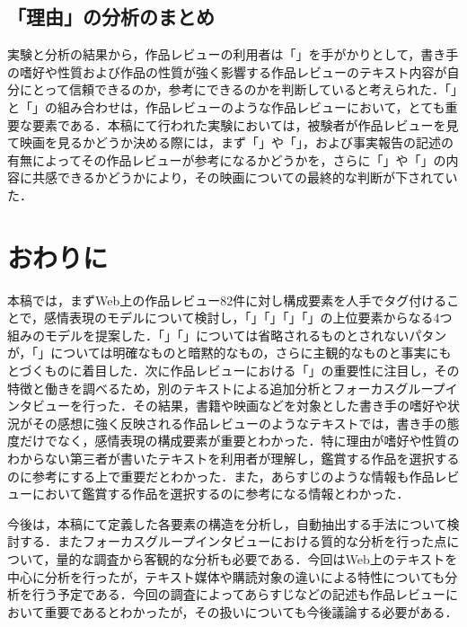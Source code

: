 \documentclass[japanese]{jnlp_1.3a}
\begin{document}
\subsection{「理由」の分析のまとめ}

実験と分析の結果から，作品レビューの利用者は「」を手がかりとして，書き手の嗜好や性質および作品の性質が強く影響する作品レビューのテキスト内容が自分にとって信頼できるのか，参考にできるのかを判断していると考えられた．「」と「」の組み合わせは，作品レビューのような作品レビューにおいて，とても重要な要素である．本稿にて行われた実験においては，被験者が作品レビューを見て映画を見るかどうか決める際には，まず「」や「」，および事実報告の記述の有無によってその作品レビューが参考になるかどうかを，さらに「」や「」の内容に共感できるかどうかにより，その映画についての最終的な判断が下されていた．

\section{おわりに}

本稿では，まずWeb上の作品レビュー82件に対し構成要素を人手でタグ付けることで，感情表現のモデルについて検討し，「」「」「」「」の上位要素からなる4つ組みのモデルを提案した．「」「」については省略されるものとされないパタンが，「」については明確なものと暗黙的なもの，さらに主観的なものと事実にもとづくものに着目した．次に作品レビューにおける「」の重要性に注目し，その特徴と働きを調べるため，別のテキストによる追加分析とフォーカスグループインタビューを行った．その結果，書籍や映画などを対象とした書き手の嗜好や状況がその感想に強く反映される作品レビューのようなテキストでは，書き手の態度だけでなく，感情表現の構成要素が重要とわかった．特に理由が嗜好や性質のわからない第三者が書いたテキストを利用者が理解し，鑑賞する作品を選択するのに参考にする上で重要だとわかった．また，あらすじのような情報も作品レビューにおいて鑑賞する作品を選択するのに参考になる情報とわかった． 


今後は，本稿にて定義した各要素の構造を分析し，自動抽出する手法について検討する．またフォーカスグループインタビューにおける質的な分析を行った点について，量的な調査から客観的な分析も必要である．今回はWeb上のテキストを中心に分析を行ったが，テキスト媒体や購読対象の違いによる特性についても分析を行う予定である．今回の調査によってあらすじなどの記述も作品レビューにおいて重要であるとわかったが，その扱いについても今後議論する必要がある．
\end{document}
